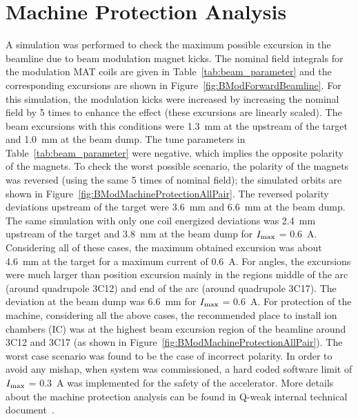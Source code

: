 \section{Machine Protection Analysis}
\label{Machine Protection Analysis}
A simulation was performed to check the maximum possible excursion in the beamline due to beam modulation magnet kicks. The nominal field integrals for the modulation MAT coils are given in Table~\ref{tab:beam_parameter} and the corresponding excursions are shown in Figure~\ref{fig:BModForwardBeamline}. For this simulation, the modulation kicks were increased by increasing the nominal field by 5 times to enhance the effect (these excursions are linearly scaled). The beam excursions with this conditions were 1.3~mm at the upstream of the target and 1.0~mm at the beam dump. The tune parameters in Table~\ref{tab:beam_parameter} were negative, which implies the opposite polarity of the magnets. To check the worst possible scenario, the polarity of the magnets was reversed (using the same 5 times of nominal field); the simulated orbits are shown in Figure~\ref{fig:BModMachineProtectionAllPair}. The reversed polarity deviations upstream of the target were 3.6~mm and 6.6~mm at the beam dump. The same simulation with only one coil energized deviations was 2.4~mm upstream of the target and 3.8~mm at the beam dump for $I_{\rm max}$ = 0.6~A.
Considering all of these cases, the maximum obtained excursion was about 4.6~mm at the target for a maximum current of 0.6~A. For angles, the excursions were much larger than position excursion mainly in the regions middle of the arc (around quadrupole 3C12) and end of the arc (around quadrupole 3C17). The deviation at the beam dump was 6.6~mm for $I_{\rm max}$ = 0.6~A.
For protection of the machine, considering all the above cases, the recommended place to install ion chambers (IC) was at the highest beam excursion region of the beamline around 3C12 and 3C17 (as shown in Figure~\ref{fig:BModMachineProtectionAllPair}). 
The worst case scenario was found to be the case of incorrect polarity. 
In order to avoid any mishap, when system was commissioned, a hard coded software limit of $I_{\rm max}$ = 0.3~A was implemented for the safety of the accelerator. 
More details about the machine protection analysis can be found in Q-weak internal technical document~\cite{nur_bm_machine_protection}.

